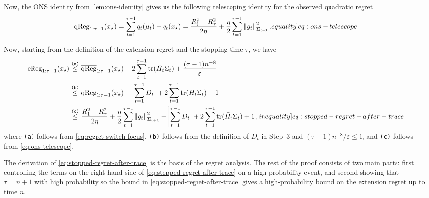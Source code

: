 \documentclass[12pt,cleveref]{jmlr}
\newcommand{\eqlabel}[1]{\label[equality]{#1}}
\newcommand{\ineqlabel}[1]{\label[inequality]{#1}}
\newcommand{\reason}[1]{\texttt{(#1)}}
\newcommand{\explan}[2]{\stackrel{\reason{#2}}{#1}}
\newcommand{\tr}{\operatorname{tr}}
\newcommand{\1}{\mathbf 1}
\newcommand{\eps}{\varepsilon}
\newcommand{\normm}[2]{\left\lVert #1\right\rVert_{#2}}
\begin{document}
Now, the ONS identity from \cref{lem:ons-identity} gives us the following telescoping identity for the observed quadratic regret
\begin{align}
    \operatorname{qReg}_{1:\tau -1}(x_{\star})
    =
    \sum_{t=1}^{\tau-1}
    q_t(\mu_t)-q_t(x_\star)
    =
    \frac{R_1^2 - R_\tau^2}{2\eta }
    +\frac{\eta}{2}\sum_{t=1}^{\tau-1}\normm{g_t}{\Sigma_{t+1}}^2.
    \eqlabel{eq:ons-telescope}
\end{align}

Now, starting from the definition of the extension regret and the stopping time $\tau$, we have
\begin{align}
    \operatorname{eReg}_{1:\tau -1}(x_{\star})
    &
    \explan{\leq}{a}
    \overline{\operatorname{qReg}}_{1:\tau -1}(x_{\star})
    +
    2\sum_{t=1}^{\tau -1}
    \tr(\bar{H}_t\Sigma_t)
    +\frac{(\tau -1) n^{-8}}{\eps}
    \\
    &
    \explan{\leq}{b}
    \operatorname{qReg}_{1:\tau -1}(x_{\star})
    +
    \left|
    \sum_{t=1}^{\tau-1} D_t
    \right|
    +
    2\sum_{t=1}^{\tau -1}
    \tr(\bar{H}_t\Sigma_t)
    +1
    \\
    &
    \explan{\leq}{c}
    \frac{R_1^2 - R_\tau^2}{2\eta}
    +
    \frac{\eta}{2}
    \sum_{t=1}^{\tau-1}\normm{g_t}{\Sigma_{t+1}}^2
    +
    \left|
    \sum_{t=1}^{\tau-1} D_t
    \right|
    +
    2\sum_{t=1}^{\tau -1}
    \tr(\bar{H}_t\Sigma_t)
    +1\,,
    \ineqlabel{eq:stopped-regret-after-trace}
\end{align}
where \reason{a} follows from \cref{eq:regret-switch-focus},
\reason{b} follows from the definition of $D_t$ in Step~3 and
$(\tau-1)n^{-8}/\eps\leq1$, and \reason{c} follows from
\cref{eq:ons-telescope}.

The derivation of \cref{eq:stopped-regret-after-trace} is the basis of the regret analysis.
The rest of the proof consists of two main parts: first controlling the terms on the right-hand side of \cref{eq:stopped-regret-after-trace} on a high-probability event, and second showing that $\tau = n+1$ with high probability
so the bound in \cref{eq:stopped-regret-after-trace} gives a high-probability bound on the extension regret up to time $n$.
\end{document}
